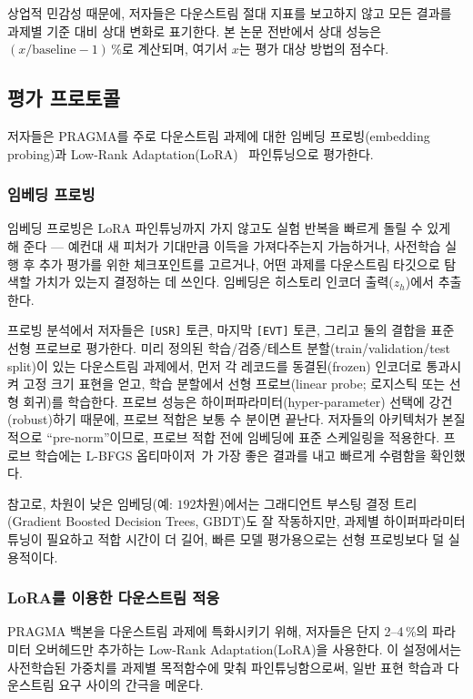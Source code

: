 상업적 민감성 때문에, 저자들은 다운스트림 절대 지표를 보고하지 않고 모든 결과를 과제별 기준 대비 상대 변화로 표기한다.
본 논문 전반에서 상대 성능은 $(x / \text{baseline} - 1)\,\%$로 계산되며, 여기서 $x$는 평가 대상 방법의 점수다.

\subsection{평가 프로토콜}
\label{sec:protocol}

저자들은 PRAGMA를 주로 다운스트림 과제에 대한 임베딩 프로빙(embedding probing)과 Low-Rank Adaptation(LoRA)~\citep{hu2022lora} 파인튜닝으로 평가한다.

\subsubsection{임베딩 프로빙}
임베딩 프로빙은 LoRA 파인튜닝까지 가지 않고도 실험 반복을 빠르게 돌릴 수 있게 해 준다 — 예컨대 새 피처가 기대만큼 이득을 가져다주는지 가늠하거나, 사전학습 실행 후 추가 평가를 위한 체크포인트를 고르거나, 어떤 과제를 다운스트림 타깃으로 탐색할 가치가 있는지 결정하는 데 쓰인다.
임베딩은 히스토리 인코더 출력($z_h$)에서 추출한다.

프로빙 분석에서 저자들은 \texttt{[USR]} 토큰, 마지막 \texttt{[EVT]} 토큰, 그리고 둘의 결합을 표준 선형 프로브로 평가한다.
미리 정의된 학습/검증/테스트 분할(train/validation/test split)이 있는 다운스트림 과제에서, 먼저 각 레코드를 동결된(frozen) 인코더로 통과시켜 고정 크기 표현을 얻고, 학습 분할에서 선형 프로브(linear probe; 로지스틱 또는 선형 회귀)를 학습한다.
프로브 성능은 하이퍼파라미터(hyper-parameter) 선택에 강건(robust)하기 때문에, 프로브 적합은 보통 수 분이면 끝난다.
저자들의 아키텍처가 본질적으로 ``pre-norm''이므로, 프로브 적합 전에 임베딩에 표준 스케일링을 적용한다.
프로브 학습에는 L-BFGS 옵티마이저~\citep{liu1989limited}가 가장 좋은 결과를 내고 빠르게 수렴함을 확인했다.

참고로, 차원이 낮은 임베딩(예: $192$차원)에서는 그래디언트 부스팅 결정 트리(Gradient Boosted Decision Trees, GBDT)도 잘 작동하지만, 과제별 하이퍼파라미터 튜닝이 필요하고 적합 시간이 더 길어, 빠른 모델 평가용으로는 선형 프로빙보다 덜 실용적이다.

\subsubsection{LoRA를 이용한 다운스트림 적응}
PRAGMA 백본을 다운스트림 과제에 특화시키기 위해, 저자들은 단지 2--4\,\%의 파라미터 오버헤드만 추가하는 Low-Rank Adaptation(LoRA)을 사용한다.
이 설정에서는 사전학습된 가중치를 과제별 목적함수에 맞춰 파인튜닝함으로써, 일반 표현 학습과 다운스트림 요구 사이의 간극을 메운다.

